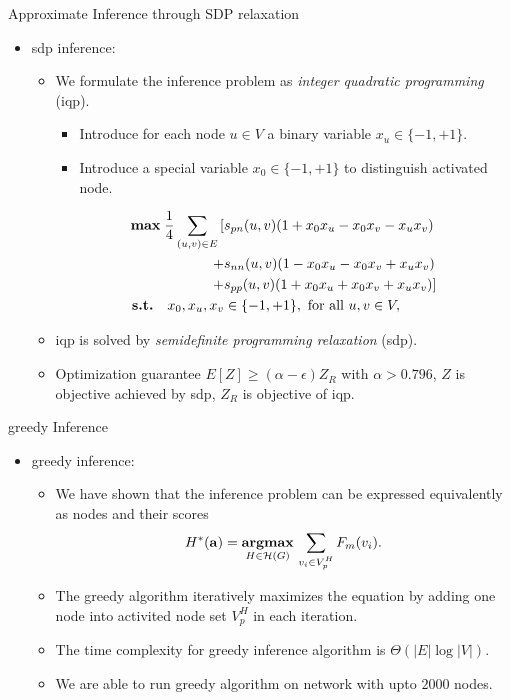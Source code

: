 \documentclass[first=dgreen,second=purple,logo=yellowexc]{aaltoslides}
\newcommand{\argmax}{\textbf{argmax}}
\newcommand{\maximize}{\textbf{max}}
\newcommand{\ab}{{\bf a}}
\newcommand{\pp}{\sc{pp}}
\newcommand{\pn}{\sc{pn}}
\newcommand{\nn}{\sc{nn}}
\begin{document}
\begin{frame}[allowframebreaks]{Approximate Inference through {\sc SDP} relaxation}
	\begin{itemize}
		\item {{\sc sdp} inference}:
		\begin{itemize}
			\item We formulate the inference problem as {\it integer quadratic programming} ({\sc iqp}).
			\begin{itemize}
				\item Introduce for each node $u\in V$ a binary variable $x_u\in\{-1,+1\}$.
				\item Introduce a special variable $x_0\in\{-1,+1\}$ to distinguish activated node.
			\end{itemize}
			{\scriptsize
			\begin{align*}
			\maximize \; \frac{1}{4} \sum_{(u, v)\in E}\, [ & s_{\pn}(u,v) (1 + x_0 x_u - x_0 x_v - x_u x_v)  \\ 
				+ & s_{\nn}(u,v) (1 - x_0 x_u - x_0 x_v + x_u x_v)  \\ 
				+ & s_{\pp}(u,v) (1 + x_0 x_u + x_0 x_v + x_u x_v) ] \\
			\textbf{s.t.} \quad  x_0, x_u, x_v &\in \{-1,+1\}, \text{ for all } u,v\in V,
			\end{align*}}
			\item {\sc iqp} is solved by {\it semidefinite programming relaxation} ({\sc sdp}).
			\item Optimization guarantee $E[Z] \ge (\alpha-\epsilon) Z_{R} $ with $\alpha>0.796$, $Z$ is objective achieved by {\sc sdp}, $Z_R$ is objective of {\sc iqp}.
		\end{itemize}
	\end{itemize}
\end{frame}

\begin{frame}{{\sc greedy} Inference}
	\begin{itemize}
		\item {{\sc greedy} inference}:		
		\begin{itemize}
			\item We have shown that the inference problem can be expressed equivalently as nodes and their scores
			{\scriptsize
			\begin{align*}
				H^{*}(\ab) = \underset{{H \in {\cal H}(G)}}{\argmax}\,\sum_{ \substack{v_i\in V^H_p}}F_m(v_i).
			\end{align*}}
			\item The greedy algorithm iteratively maximizes the equation by adding one node into activited node set $V_p^H$ in each iteration.
			\item The time complexity for greedy inference algorithm is $\Theta(|E|\log|V|)$.
			\item We are able to run {\sc greedy} algorithm on network with upto $2000$ nodes.
		\end{itemize}
	\end{itemize}
\end{frame}
\end{document}
